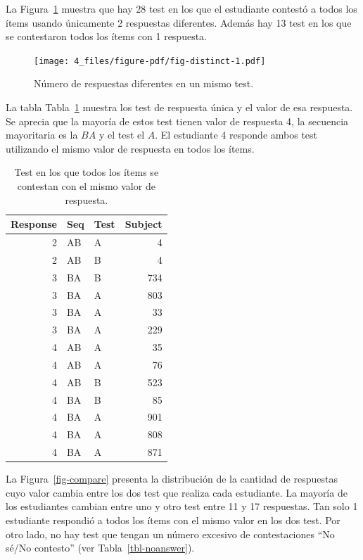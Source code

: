 \documentclass[
  12pt,
  a4paper,
  extrafontsizes,
  onecolumn,
  openright,
  table]{memoir}
\begin{document}
La Figura~\ref{fig-distinct} muestra que hay 28 test en los que el
estudiante contestó a todos los ítems usando únicamente 2 respuestas
diferentes. Además hay 13 test en los que se contestaron todos los ítems
con 1 respuesta.

\begin{figure}[h]

{\centering \texttt{[image: 4\_files/figure-pdf/fig-distinct-1.pdf]}

}

\caption{\label{fig-distinct}Número de respuestas diferentes en un mismo
test.}

\end{figure}

La tabla Tabla~\ref{tbl-distinct2} muestra los test de respuesta única y
el valor de esa respuesta. Se aprecia que la mayoría de estos test
tienen valor de respuesta 4, la secuencia mayoritaria es la \(BA\) y el
test el \(A\). El estudiante 4 responde ambos test utilizando el mismo
valor de respuesta en todos los ítems.

\hypertarget{tbl-distinct2}{}
\begin{longtable}{rllr}
\caption{\label{tbl-distinct2}Test en los que todos los ítems se contestan con el mismo valor de
respuesta. }\tabularnewline

\toprule
Response & Seq & Test & Subject \\ 
\midrule
2 & AB & A & 4 \\ 
2 & AB & B & 4 \\ 
3 & BA & B & 734 \\ 
3 & BA & A & 803 \\ 
3 & BA & A & 33 \\ 
3 & BA & A & 229 \\ 
4 & AB & A & 35 \\ 
4 & AB & A & 76 \\ 
4 & AB & B & 523 \\ 
4 & BA & B & 85 \\ 
4 & BA & A & 901 \\ 
4 & BA & A & 808 \\ 
4 & BA & A & 871 \\ 
\bottomrule
\end{longtable}

La Figura~\ref{fig-compare} presenta la distribución de la cantidad de
respuestas cuyo valor cambia entre los dos test que realiza cada
estudiante. La mayoría de los estudiantes cambian entre uno y otro test
entre 11 y 17 respuestas. Tan solo 1 estudiante respondió a todos los
ítems con el mismo valor en los dos test. Por otro lado, no hay test que
tengan un número excesivo de contestaciones \enquote{No sé/No contesto}
(ver Tabla~\ref{tbl-noanswer}).
\end{document}

